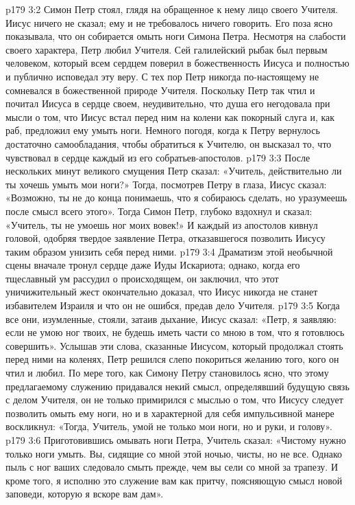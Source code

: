 \vs p179 3:2 Симон Петр стоял, глядя на обращенное к нему лицо своего Учителя. Иисус ничего не сказал; ему и не требовалось ничего говорить. Его поза ясно показывала, что он собирается омыть ноги Симона Петра. Несмотря на слабости своего характера, Петр любил Учителя. Сей галилейский рыбак был первым человеком, который всем сердцем поверил в божественность Иисуса и полностью и публично исповедал эту веру. С тех пор Петр никогда по\hyp{}настоящему не сомневался в божественной природе Учителя. Поскольку Петр так чтил и почитал Иисуса в сердце своем, неудивительно, что душа его негодовала при мысли о том, что Иисус встал перед ним на колени как покорный слуга и, как раб, предложил ему умыть ноги. Немного погодя, когда к Петру вернулось достаточно самообладания, чтобы обратиться к Учителю, он высказал то, что чувствовал в сердце каждый из его собратьев\hyp{}апостолов.
\vs p179 3:3 После нескольких минут великого смущения Петр сказал: «Учитель, действительно ли ты хочешь умыть мои ноги?» Тогда, посмотрев Петру в глаза, Иисус сказал: «Возможно, ты не до конца понимаешь, что я собираюсь сделать, но уразумеешь после смысл всего этого». Тогда Симон Петр, глубоко вздохнул и сказал: «Учитель, ты не умоешь ног моих вовек!» И каждый из апостолов кивнул головой, одобряя твердое заявление Петра, отказавшегося позволить Иисусу таким образом унизить себя перед ними.
\vs p179 3:4 Драматизм этой необычной сцены вначале тронул сердце даже Иуды Искариота; однако, когда его тщеславный ум рассудил о происходящем, он заключил, что этот уничижительный жест окончательно доказал, что Иисус никогда не станет избавителем Израиля и что он не ошибся, предав дело Учителя.
\vs p179 3:5 Когда все они, изумленные, стояли, затаив дыхание, Иисус сказал: «Петр, я заявляю: если не умою ног твоих, не будешь иметь части со мною в том, что я готовлюсь совершить». Услышав эти слова, сказанные Иисусом, который продолжал стоять перед ними на коленях, Петр решился слепо покориться желанию того, кого он чтил и любил. По мере того, как Симону Петру становилось ясно, что этому предлагаемому служению придавался некий смысл, определявший будущую связь с делом Учителя, он не только примирился с мыслью о том, что Иисусу следует позволить омыть ему ноги, но и в характерной для себя импульсивной манере воскликнул: «Тогда, Учитель, умой не только мои ноги, но и руки, и голову».
\vs p179 3:6 Приготовившись омывать ноги Петра, Учитель сказал: «Чистому нужно только ноги умыть. Вы, сидящие со мной этой ночью, чисты, но не все. Однако пыль с ног ваших следовало смыть прежде, чем вы сели со мной за трапезу. И кроме того, я исполню это служение вам как притчу, поясняющую смысл новой заповеди, которую я вскоре вам дам».
